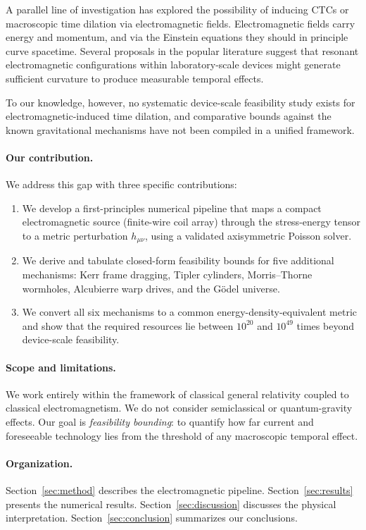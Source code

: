 \documentclass[11pt,a4paper,twocolumn]{article}
\begin{document}
A parallel line of investigation has explored the possibility of inducing CTCs or macroscopic time dilation via electromagnetic fields. Electromagnetic fields carry energy and momentum, and via the Einstein equations they should in principle curve spacetime. Several proposals in the popular literature suggest that resonant electromagnetic configurations within laboratory-scale devices might generate sufficient curvature to produce measurable temporal effects.

To our knowledge, however, no systematic device-scale feasibility study exists for electromagnetic-induced time dilation, and comparative bounds against the known gravitational mechanisms have not been compiled in a unified framework.

\paragraph{Our contribution.} We address this gap with three specific contributions:

\begin{enumerate}
\item We develop a first-principles numerical pipeline that maps a compact electromagnetic source (finite-wire coil array) through the stress-energy tensor to a metric perturbation $h_{\mu\nu}$, using a validated axisymmetric Poisson solver.
\item We derive and tabulate closed-form feasibility bounds for five additional mechanisms: Kerr frame dragging, Tipler cylinders, Morris--Thorne wormholes, Alcubierre warp drives, and the G\"odel universe.
\item We convert all six mechanisms to a common energy-density-equivalent metric and show that the required resources lie between $10^{20}$ and $10^{49}$ times beyond device-scale feasibility.
\end{enumerate}

\paragraph{Scope and limitations.} We work entirely within the framework of classical general relativity coupled to classical electromagnetism. We do not consider semiclassical or quantum-gravity effects. Our goal is \emph{feasibility bounding}: to quantify how far current and foreseeable technology lies from the threshold of any macroscopic temporal effect.

\paragraph{Organization.} Section~\ref{sec:method} describes the electromagnetic pipeline. Section~\ref{sec:results} presents the numerical results. Section~\ref{sec:discussion} discusses the physical interpretation. Section~\ref{sec:conclusion} summarizes our conclusions.
\end{document}

